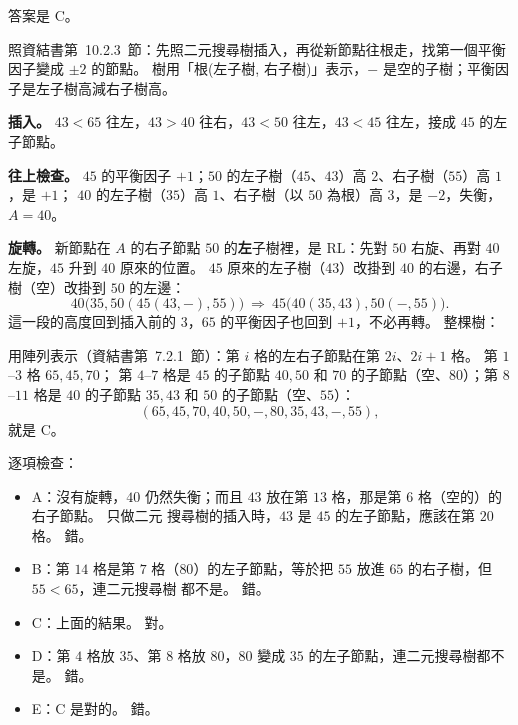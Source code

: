 \begin{pastsoln}
答案是 C。

照資結書第~10.2.3~節：先照二元搜尋樹插入，再從新節點往根走，找第一個平衡因子變成 $\pm 2$ 的節點。
樹用「根(左子樹, 右子樹)」表示，$-$ 是空的子樹；平衡因子是左子樹高減右子樹高。

\textbf{插入。} $43 < 65$ 往左，$43 > 40$ 往右，$43 < 50$ 往左，$43 < 45$ 往左，接成 $45$ 的左子節點。

\textbf{往上檢查。} $45$ 的平衡因子 $+1$；$50$ 的左子樹（$45$、$43$）高 $2$、右子樹（$55$）高 $1$，是 $+1$；
$40$ 的左子樹（$35$）高 $1$、右子樹（以 $50$ 為根）高 $3$，是 $-2$，失衡，$A = 40$。

\textbf{旋轉。} 新節點在 $A$ 的右子節點 $50$ 的\textbf{左}子樹裡，是 RL：先對 $50$ 右旋、再對 $40$ 左旋，$45$
升到 $40$ 原來的位置。 $45$ 原來的左子樹（$43$）改掛到 $40$ 的右邊，右子樹（空）改掛到 $50$ 的左邊：
\[
40\bigl(35, 50(45(43, -), 55)\bigr) \ \Longrightarrow\ 45\bigl(40(35, 43), 50(-, 55)\bigr).
\]
這一段的高度回到插入前的 $3$，$65$ 的平衡因子也回到 $+1$，不必再轉。 整棵樹：
\begin{center}
\end{center}
用陣列表示（資結書第~7.2.1~節）：第 $i$ 格的左右子節點在第 $2i$、$2i + 1$ 格。 第 $1$--$3$ 格 $65, 45, 70$；
第 $4$--$7$ 格是 $45$ 的子節點 $40, 50$ 和 $70$ 的子節點（空、$80$）；第 $8$--$11$ 格是 $40$ 的子節點
$35, 43$ 和 $50$ 的子節點（空、$55$）：
\[
(65, 45, 70, 40, 50, -, 80, 35, 43, -, 55),
\]
就是 C。

逐項檢查：
\begin{itemize}
\item A：沒有旋轉，$40$ 仍然失衡；而且 $43$ 放在第 $13$ 格，那是第 $6$ 格（空的）的右子節點。 只做二元
搜尋樹的插入時，$43$ 是 $45$ 的左子節點，應該在第 $20$ 格。 錯。
\item B：第 $14$ 格是第 $7$ 格（$80$）的左子節點，等於把 $55$ 放進 $65$ 的右子樹，但 $55 < 65$，連二元搜尋樹
都不是。 錯。
\item C：上面的結果。 對。
\item D：第 $4$ 格放 $35$、第 $8$ 格放 $80$，$80$ 變成 $35$ 的左子節點，連二元搜尋樹都不是。 錯。
\item E：C 是對的。 錯。
\end{itemize}
\end{pastsoln}
